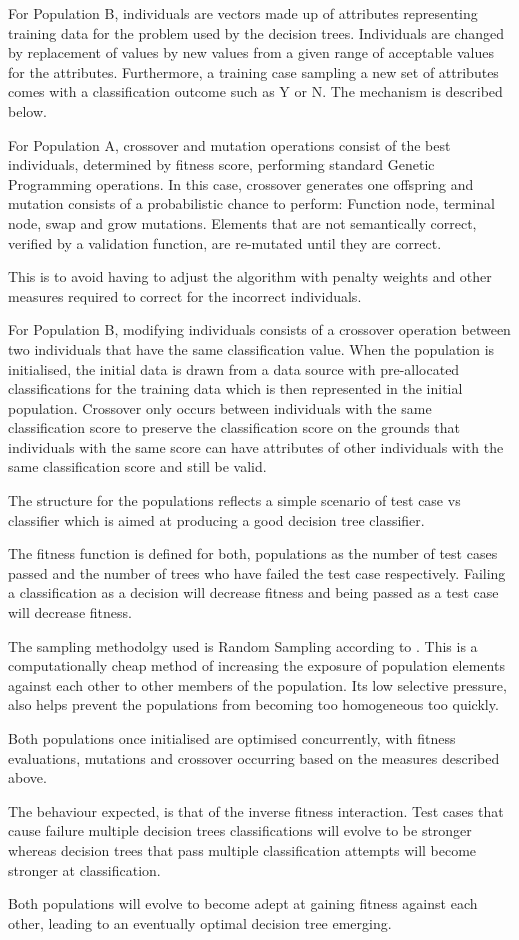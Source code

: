 \documentclass[12pt]{article}
\begin{document}
For Population B, individuals are vectors made up of attributes representing training data for the problem used by the decision trees. Individuals are changed by replacement of values by new values from a given range of acceptable values for the attributes. Furthermore, a training case sampling a new set of attributes comes with a classification outcome such as Y or N. The mechanism is described below.

For Population A, crossover and mutation operations consist of the best individuals, determined by fitness score, performing standard Genetic Programming operations. In this case, crossover generates one offspring and mutation consists of a probabilistic chance to perform: Function node, terminal node, swap and grow mutations. Elements that are not semantically correct, verified by a validation function, are re-mutated until they are correct.

This is to avoid having to adjust the algorithm with penalty weights and other measures required to correct for the incorrect individuals.

For Population B, modifying individuals consists of a crossover operation between two individuals that have the same classification value. When the population is initialised, the initial data is drawn from a data source with pre-allocated classifications for the training data which is then represented in the initial population. Crossover only occurs between individuals with the same classification score to preserve the classification score on the grounds that individuals with the same score can have attributes of other individuals with the same classification score and still be valid.

The structure for the populations reflects a simple scenario of test case vs classifier which is aimed at producing a good decision tree classifier. 

The fitness function is defined for both, populations as the number of test cases passed and the number of trees who have failed the test case respectively. Failing a classification as a decision will decrease fitness and being passed as a test case will decrease fitness.

The sampling methodolgy used is Random Sampling according to \cite{REED1967319}. This is a computationally cheap method of increasing the exposure of population elements against each other to other members of the population. Its low selective pressure, also helps prevent the populations from becoming too homogeneous too quickly.

Both populations once initialised are optimised concurrently, with fitness evaluations, mutations and crossover occurring based on the measures described above.

The behaviour expected, is that of the inverse fitness interaction. Test cases that cause failure multiple decision trees classifications will evolve to be stronger whereas decision trees that pass multiple classification attempts will become stronger at classification.

Both populations will evolve to become adept at gaining fitness against each other, leading to an eventually optimal decision tree emerging.


\end{document}
